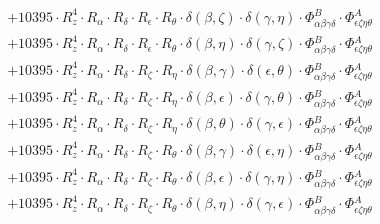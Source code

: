 \documentclass{article}
\begin{document}
\begin{equation}
\begin{array}{c}
 \\[0.2em] 		 + 10395 \cdot R_{z}^{4} \cdot R_{\alpha{}} \cdot R_{\delta{}} \cdot R_{\epsilon{}} \cdot R_{\theta{}} \cdot \delta{}\left(\beta{}, \zeta{}\right) \cdot \delta{}\left(\gamma{}, \eta{}\right) \cdot \Phi{}^{B}_{\alpha{}\beta{}\gamma{}\delta{}} \cdot \Phi{}^{A}_{\epsilon{}\zeta{}\eta{}\theta{}} 
 \\[0.2em] 		 + 10395 \cdot R_{z}^{4} \cdot R_{\alpha{}} \cdot R_{\delta{}} \cdot R_{\epsilon{}} \cdot R_{\theta{}} \cdot \delta{}\left(\beta{}, \eta{}\right) \cdot \delta{}\left(\gamma{}, \zeta{}\right) \cdot \Phi{}^{B}_{\alpha{}\beta{}\gamma{}\delta{}} \cdot \Phi{}^{A}_{\epsilon{}\zeta{}\eta{}\theta{}} 
 \\[0.2em] 		 + 10395 \cdot R_{z}^{4} \cdot R_{\alpha{}} \cdot R_{\delta{}} \cdot R_{\zeta{}} \cdot R_{\eta{}} \cdot \delta{}\left(\beta{}, \gamma{}\right) \cdot \delta{}\left(\epsilon{}, \theta{}\right) \cdot \Phi{}^{B}_{\alpha{}\beta{}\gamma{}\delta{}} \cdot \Phi{}^{A}_{\epsilon{}\zeta{}\eta{}\theta{}} 
 \\[0.2em] 		 + 10395 \cdot R_{z}^{4} \cdot R_{\alpha{}} \cdot R_{\delta{}} \cdot R_{\zeta{}} \cdot R_{\eta{}} \cdot \delta{}\left(\beta{}, \epsilon{}\right) \cdot \delta{}\left(\gamma{}, \theta{}\right) \cdot \Phi{}^{B}_{\alpha{}\beta{}\gamma{}\delta{}} \cdot \Phi{}^{A}_{\epsilon{}\zeta{}\eta{}\theta{}} 
 \\[0.2em] 		 + 10395 \cdot R_{z}^{4} \cdot R_{\alpha{}} \cdot R_{\delta{}} \cdot R_{\zeta{}} \cdot R_{\eta{}} \cdot \delta{}\left(\beta{}, \theta{}\right) \cdot \delta{}\left(\gamma{}, \epsilon{}\right) \cdot \Phi{}^{B}_{\alpha{}\beta{}\gamma{}\delta{}} \cdot \Phi{}^{A}_{\epsilon{}\zeta{}\eta{}\theta{}} 
 \\[0.2em] 		 + 10395 \cdot R_{z}^{4} \cdot R_{\alpha{}} \cdot R_{\delta{}} \cdot R_{\zeta{}} \cdot R_{\theta{}} \cdot \delta{}\left(\beta{}, \gamma{}\right) \cdot \delta{}\left(\epsilon{}, \eta{}\right) \cdot \Phi{}^{B}_{\alpha{}\beta{}\gamma{}\delta{}} \cdot \Phi{}^{A}_{\epsilon{}\zeta{}\eta{}\theta{}} 
 \\[0.2em] 		 + 10395 \cdot R_{z}^{4} \cdot R_{\alpha{}} \cdot R_{\delta{}} \cdot R_{\zeta{}} \cdot R_{\theta{}} \cdot \delta{}\left(\beta{}, \epsilon{}\right) \cdot \delta{}\left(\gamma{}, \eta{}\right) \cdot \Phi{}^{B}_{\alpha{}\beta{}\gamma{}\delta{}} \cdot \Phi{}^{A}_{\epsilon{}\zeta{}\eta{}\theta{}} 
 \\[0.2em] 		 + 10395 \cdot R_{z}^{4} \cdot R_{\alpha{}} \cdot R_{\delta{}} \cdot R_{\zeta{}} \cdot R_{\theta{}} \cdot \delta{}\left(\beta{}, \eta{}\right) \cdot \delta{}\left(\gamma{}, \epsilon{}\right) \cdot \Phi{}^{B}_{\alpha{}\beta{}\gamma{}\delta{}} \cdot \Phi{}^{A}_{\epsilon{}\zeta{}\eta{}\theta{}} 

\end{array}
\end{equation}
\end{document}
